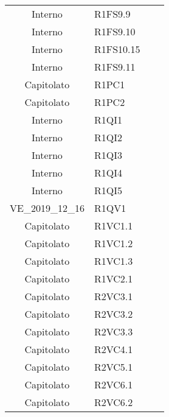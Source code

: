 {\begin{longtable}{ c C{4cm} c c}
Interno & R1FS9.9\\

Interno & R1FS9.10\\

Interno & R1FS10.15\\

Interno & R1FS9.11\\


Capitolato & R1PC1\\

Capitolato & R1PC2\\


Interno & R1QI1\\

Interno & R1QI2\\

Interno & R1QI3\\

Interno & R1QI4\\

Interno & R1QI5\\

VE\_2019\_12\_16 & R1QV1\\


Capitolato & R1VC1.1\\

Capitolato & R1VC1.2\\

Capitolato & R1VC1.3\\

Capitolato & R1VC2.1\\

Capitolato & R2VC3.1\\

Capitolato & R2VC3.2\\

Capitolato & R2VC3.3\\

Capitolato & R2VC4.1\\

Capitolato & R2VC5.1\\


Capitolato & R2VC6.1\\

Capitolato & R2VC6.2\\


\end{longtable}}
